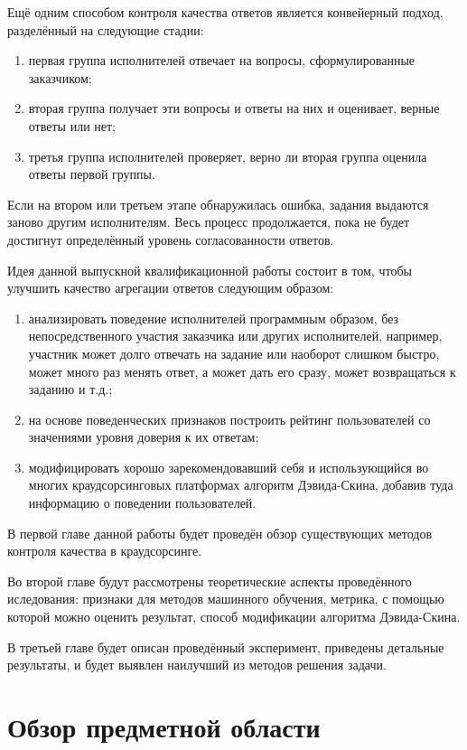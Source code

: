\documentclass[specification,annotation,times]{itmo-student-thesis}
\begin{document}
Ещё одним способом контроля качества ответов является конвейерный подход, разделённый на следующие стадии:
\begin{enumerate}
    \item первая группа исполнителей отвечает на вопросы, сформулированные заказчиком;
    \item вторая группа получает эти вопросы и ответы на них и оценивает, верные ответы или нет;
    \item третья группа исполнителей проверяет, верно ли вторая группа оценила ответы первой группы.
\end{enumerate}
Если на втором или третьем этапе обнаружилась ошибка, задания выдаются заново другим исполнителям. Весь процесс продолжается, пока не будет достигнут определённый уровень согласованности ответов.

Идея данной выпускной квалификационной работы состоит в том, чтобы улучшить качество агрегации ответов следующим образом:
\begin{enumerate}
    \item анализировать поведение исполнителей программным образом, без непосредственного участия заказчика или других исполнителей, например, участник может долго отвечать на задание или наоборот слишком быстро, может много раз менять ответ, а может дать его сразу, может возвращаться к заданию и т.д.;
    \item на основе поведенческих признаков построить рейтинг пользователей со значениями уровня доверия к их ответам;
    \item модифицировать хорошо зарекомендовавший себя и использующийся во многих краудсорсинговых платформах алгоритм Дэвида-Скина, добавив туда информацию о поведении пользователей.
\end{enumerate}

В первой главе данной работы будет проведён обзор существующих методов контроля качества в краудсорсинге.

Во второй главе будут рассмотрены теоретические аспекты проведённого иследования: признаки для методов машинного обучения, метрика, с помощью которой можно оценить результат, способ модификации алгоритма Дэвида-Скина.

В третьей главе будет описан проведённый эксперимент, приведены детальные результаты, и будет выявлен наилучший из методов решения задачи.

\chapter{Обзор предметной области}
\end{document}
